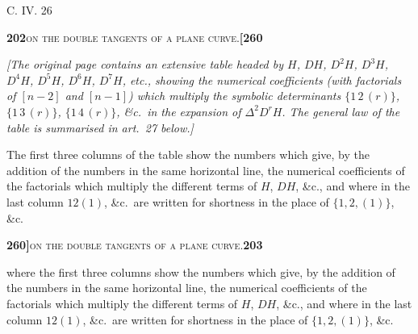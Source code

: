 \documentclass[11pt]{article}
\begin{document}
\noindent\hfill C. IV. \hfill 26

\newpage

\noindent\textbf{202}\hfill\textsc{on the double tangents of a plane curve.}\hfill\textbf{[260}

\medskip

\noindent\textit{[The original page contains an extensive table headed by $H$, $DH$, $D^2H$, $D^3H$, $D^4H$, $D^5H$, $D^6H$, $D^7H$, etc., showing the numerical coefficients (with factorials of $[n-2]$ and $[n-1]$) which multiply the symbolic determinants $\{1\,2\,(r)\}$, $\{1\,3\,(r)\}$, $\{1\,4\,(r)\}$, \&c.\ in the expansion of $\Delta^2 D^r H$. The general law of the table is summarised in art.~27 below.]}

\medskip

\noindent The first three columns of the table show the numbers which give, by the addition of the numbers in the same horizontal line, the numerical coefficients of the factorials which multiply the different terms of $H$, $DH$, \&c., and where in the last column $12(1)$, \&c.\ are written for shortness in the place of $\{1, 2, (1)\}$, \&c.

\newpage

\noindent\textbf{260]}\hfill\textsc{on the double tangents of a plane curve.}\hfill\textbf{203}

\medskip

\noindent where the first three columns show the numbers which give, by the addition of the numbers in the same horizontal line, the numerical coefficients of the factorials which multiply the different terms of $H$, $DH$, \&c., and where in the last column $12(1)$, \&c.\ are written for shortness in the place of $\{1, 2, (1)\}$, \&c.

\medskip
\end{document}
